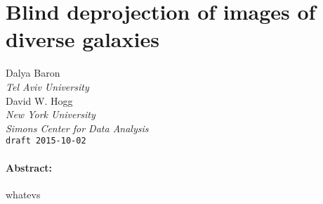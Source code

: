 \documentclass[12pt]{article}
\begin{document}
\section*{Blind deprojection of images of diverse galaxies}
\noindent
Dalya Baron \\
\textsl{Tel Aviv University} \\
David W. Hogg \\
\textsl{New York University} \\
\textsl{Simons Center for Data Analysis}\\
\texttt{draft 2015-10-02}

\paragraph{Abstract:}
whatevs
\end{document}

